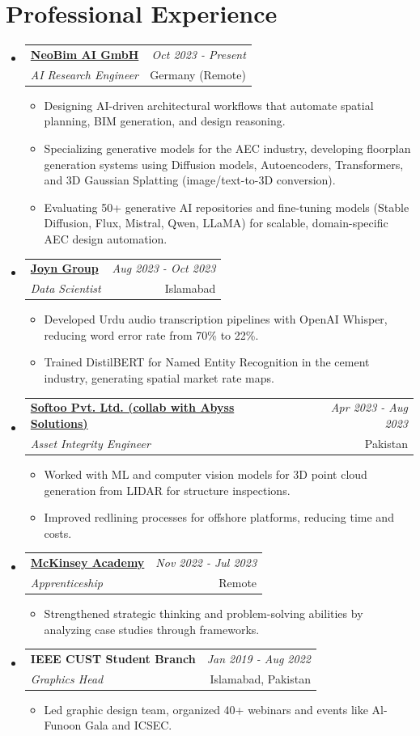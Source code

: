 \documentclass[a4paper,11pt]{article}
\makeatletter
\newcommand{\resumeSubheading}[4]{
\vspace{0.5mm}\item
    \begin{tabular*}{0.98\textwidth}[t]{l@{\extracolsep{\fill}}r}
        \textbf{#1} & \textit{\footnotesize{#4}} \\
        \textit{\footnotesize{#3}} &  \footnotesize{#2}\\
    \end{tabular*}
    \vspace{-2.4mm}
}
\newcommand{\resumeSubHeadingListStart}{\begin{itemize}[leftmargin=*,labelsep=1mm]}
\newcommand{\resumeItemListStart}{\begin{itemize}[leftmargin=*,labelsep=1mm,itemsep=0.5mm]}
\newcommand{\resumeSubHeadingListEnd}{\end{itemize}\vspace{2mm}}
\newcommand{\resumeItemListEnd}{\end{itemize}\vspace{-2mm}}
\makeatother
\begin{document}
\section{\textbf{Professional Experience}}
\vspace{-0.4mm}
\resumeSubHeadingListStart
\resumeSubheading
{\href{https://neobim.ai/}{NeoBim AI GmbH}}{Germany (Remote)}
{AI Research Engineer}{Oct 2023 - Present}
\resumeItemListStart
\item Designing AI-driven architectural workflows that automate spatial planning, BIM generation, and design reasoning.
\item Specializing generative models for the AEC industry, developing floorplan generation systems using Diffusion models, Autoencoders, Transformers, and 3D Gaussian Splatting (image/text-to-3D conversion).
\item Evaluating 50+ generative AI repositories and fine-tuning models (Stable Diffusion, Flux, Mistral, Qwen, LLaMA) for scalable, domain-specific AEC design automation.
\resumeItemListEnd
\resumeSubheading
{\href{https://joyngroup.com/}{Joyn Group}}{Islamabad}
{Data Scientist}{Aug 2023 - Oct 2023}
\resumeItemListStart
\item Developed Urdu audio transcription pipelines with OpenAI Whisper, reducing word error rate from 70\% to 22\%.
\item Trained DistilBERT for Named Entity Recognition in the cement industry, generating spatial market rate maps.
\resumeItemListEnd
\resumeSubheading
{\href{https://abysssolutions.co/}{Softoo Pvt. Ltd. (collab with Abyss Solutions)}}{Pakistan}
{Asset Integrity Engineer}{Apr 2023 - Aug 2023}
\resumeItemListStart
\item Worked with ML and computer vision models for 3D point cloud generation from LIDAR for structure inspections.
\item Improved redlining processes for offshore platforms, reducing time and costs.
\resumeItemListEnd
\resumeSubheading
{\href{https://www.mckinsey.com/capabilities/people-and-organizational-performance/how-we-help-clients/mckinsey-academy}{McKinsey Academy}}{Remote}
{Apprenticeship}{Nov 2022 - Jul 2023}
\resumeItemListStart
\item Strengthened strategic thinking and problem-solving abilities by analyzing case studies through frameworks.
\resumeItemListEnd
\resumeSubheading
{IEEE CUST Student Branch}{Islamabad, Pakistan}
{Graphics Head}{Jan 2019 - Aug 2022}
\resumeItemListStart
\item Led graphic design team, organized 40+ webinars and events like Al-Funoon Gala and ICSEC.
\resumeItemListEnd
\resumeSubHeadingListEnd
\vspace{-6mm}
\end{document}
